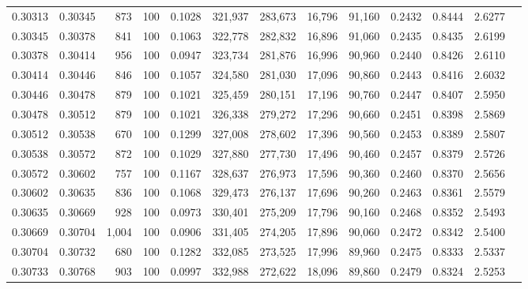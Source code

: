\begin{tabular}{rrrrrrrrrrrrr}
0.30313 & 0.30345 &    873 & 100 &                                     0.1028 & 321,937 & 283,673 &  16,796 &  91,160 & 0.2432 & 0.8444 & 2.6277 \\
0.30345 & 0.30378 &    841 & 100 &                                     0.1063 & 322,778 & 282,832 &  16,896 &  91,060 & 0.2435 & 0.8435 & 2.6199 \\
0.30378 & 0.30414 &    956 & 100 &                                     0.0947 & 323,734 & 281,876 &  16,996 &  90,960 & 0.2440 & 0.8426 & 2.6110 \\
0.30414 & 0.30446 &    846 & 100 &                                     0.1057 & 324,580 & 281,030 &  17,096 &  90,860 & 0.2443 & 0.8416 & 2.6032 \\
0.30446 & 0.30478 &    879 & 100 &                                     0.1021 & 325,459 & 280,151 &  17,196 &  90,760 & 0.2447 & 0.8407 & 2.5950 \\
0.30478 & 0.30512 &    879 & 100 &                                     0.1021 & 326,338 & 279,272 &  17,296 &  90,660 & 0.2451 & 0.8398 & 2.5869 \\
0.30512 & 0.30538 &    670 & 100 &                                     0.1299 & 327,008 & 278,602 &  17,396 &  90,560 & 0.2453 & 0.8389 & 2.5807 \\
0.30538 & 0.30572 &    872 & 100 &                                     0.1029 & 327,880 & 277,730 &  17,496 &  90,460 & 0.2457 & 0.8379 & 2.5726 \\
0.30572 & 0.30602 &    757 & 100 &                                     0.1167 & 328,637 & 276,973 &  17,596 &  90,360 & 0.2460 & 0.8370 & 2.5656 \\
0.30602 & 0.30635 &    836 & 100 &                                     0.1068 & 329,473 & 276,137 &  17,696 &  90,260 & 0.2463 & 0.8361 & 2.5579 \\
0.30635 & 0.30669 &    928 & 100 &                                     0.0973 & 330,401 & 275,209 &  17,796 &  90,160 & 0.2468 & 0.8352 & 2.5493 \\
0.30669 & 0.30704 &  1,004 & 100 &                                     0.0906 & 331,405 & 274,205 &  17,896 &  90,060 & 0.2472 & 0.8342 & 2.5400 \\
0.30704 & 0.30732 &    680 & 100 &                                     0.1282 & 332,085 & 273,525 &  17,996 &  89,960 & 0.2475 & 0.8333 & 2.5337 \\
0.30733 & 0.30768 &    903 & 100 &                                     0.0997 & 332,988 & 272,622 &  18,096 &  89,860 & 0.2479 & 0.8324 & 2.5253 \\

\end{tabular}
